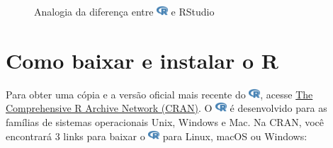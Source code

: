 \documentclass[
  letterpaper,
]{book}
\theoremstyle{plain}
\theoremstyle{definition}
\theoremstyle{remark}
\begin{document}
\begin{figure}
\begin{minipage}{0.49\linewidth}
{}


\end{minipage}%

\caption{\label{fig-r-vs-rstudio-ide-1}Analogia da diferença entre
\includegraphics[width=1.13em,height=1em]{getting_started_with_r_files/figure-pdf/fa-icon-9b00320707d42527dde67262afb33ded.pdf}
e RStudio}

\end{figure}%

\section{Como baixar e instalar o R}\label{como-baixar-e-instalar-o-r}

Para obter uma cópia e a versão oficial mais recente do
\includegraphics[width=1.13em,height=1em]{getting_started_with_r_files/figure-pdf/fa-icon-9b00320707d42527dde67262afb33ded.pdf},
acesse \href{https://cran.r-project.org/}{The Comprehensive R Archive
Network (CRAN)}. O
\includegraphics[width=1.13em,height=1em]{getting_started_with_r_files/figure-pdf/fa-icon-9b00320707d42527dde67262afb33ded.pdf}
é desenvolvido para as famílias de sistemas operacionais Unix, Windows e
Mac. Na CRAN, você encontrará 3 links para baixar o
\includegraphics[width=1.13em,height=1em]{getting_started_with_r_files/figure-pdf/fa-icon-9b00320707d42527dde67262afb33ded.pdf}
para Linux, macOS ou Windows:
\end{document}
